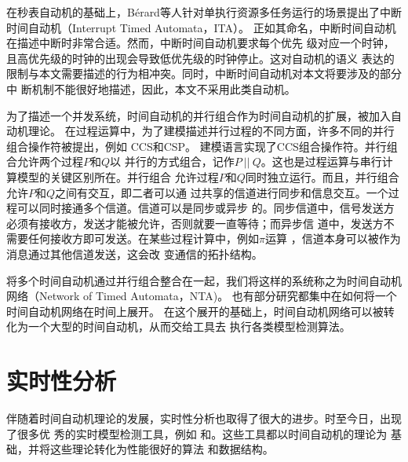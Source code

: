 在秒表自动机的基础上，B{\'e}rard等人针对单执行资源多任务运行的场景提出了中断
时间自动机（Interrupt Timed Automata，ITA）。\cite{Berard:2012:ITA:2158996.2159045}
正如其命名，中断时间自动机在描述中断时非常合适。然而，中断时间自动机要求每个优先
级对应一个时钟，且高优先级的时钟的出现会导致低优先级的时钟停止。这对自动机的语义
表达的限制与本文需要描述的行为相冲突。同时，中断时间自动机对本文将要涉及的部分中
断机制不能很好地描述，因此，本文不采用此类自动机。

为了描述一个并发系统，时间自动机的并行组合作为时间自动机的扩展，被加入自动机理论。
在过程运算中，为了建模描述并行过程的不同方面，许多不同的并行组合操作符被提出，例如
CCS\cite{Milner:1989:CC:534666}和CSP\cite{Hoare:1978:CSP:359576.359585}。\uppaal 
建模语言\cite{Larsen97uppaalin}实现了CCS组合操作符。并行组合允许两个过程$P$和$Q$以
并行的方式组合，记作$P~||~Q$。这也是过程运算与串行计算模型的关键区别所在。并行组合
允许过程$P$和$Q$同时独立运行。而且，并行组合允许$P$和$Q$之间有交互，即二者可以通
过共享的信道进行同步和信息交互。一个过程可以同时接通多个信道。信道可以是同步或异步
的。同步信道中，信号发送方必须有接收方，发送才能被允许，否则就要一直等待；而异步信
道中，发送方不需要任何接收方即可发送。在某些过程计算中，例如$\pi$运算
\cite{Sangiorgi:2001:PTM:559050}，信道本身可以被作为消息通过其他信道发送，这会改
变通信的拓扑结构。

将多个时间自动机通过并行组合整合在一起，我们将这样的系统称之为时间自动机网络（Network 
of Timed Automata，NTA)\cite{Alur:1994:TTA:180782.180519,Bouyer06timedunfoldings}。
也有部分研究都集中在如何将一个时间自动机网络在时间上展开。\cite{Bouyer06timedunfoldings}
在这个展开的基础上，时间自动机网络可以被转化为一个大型的时间自动机，从而交给工具去
执行各类模型检测算法。\cite{Bengtsson04timedautomata:}

\section{实时性分析}
\label{sec:timing_study}

伴随着时间自动机理论的发展，实时性分析也取得了很大的进步。时至今日，出现了很多优
秀的实时模型检测工具，例如\uppaal \cite{Behrmann04atutorial, Larsen97efficientverification}
和\cite{Yovine97kronos:a}。这些工具都以时间自动机的理论为
基础，并将这些理论转化为性能很好的算法
\cite{Behrmann:2002:UIS:646847.707113, Behrmann:2006:LUB:1165374.1165376, BehrmannHV00, Behrmann:to}
和数据结构\cite{Behrmann98efficienttimed, Larsen97efficientverification, Larsen:1999:CDD:774455.774459}。

